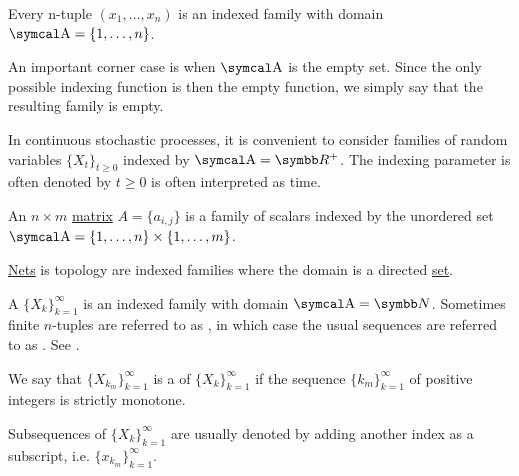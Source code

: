 \begin{example}\label{ex:indexed_families}
  \mbox{}
  \begin{defenum}
    \item Every n-tuple \( (x_1, \ldots, x_n) \) is an indexed family with domain \( \CA = \{ 1, \ldots, n \} \).

    \item An important corner case is when \( \CA \) is the empty set. Since the only possible indexing function is then the empty function, we simply say that the resulting family is empty.

    \item In continuous stochastic processes, it is convenient to consider families of random variables \( \{ X_t \}_{t \geq 0} \) indexed by \( \CA = \BR^+ \). The indexing parameter is often denoted by \( t \geq 0 \) is often interpreted as time.

    \item An \( n \times m \) \hyperref[def:array/matrix]{matrix} \( A = \{ a_{i,j} \} \) is a family of scalars indexed by the unordered set \( \CA = \{ 1, \ldots, n \} \times \{ 1, \ldots, m \} \).

    \item \hyperref[def:topological_net]{Nets} is topology are indexed families where the domain is a directed \hyperref[def:directed_set]{set}.
  \end{defenum}
\end{example}

\begin{definition}\label{def:sequence}
  A  \( \{ X_k \}_{k=1}^\infty \) is an indexed family with domain \( \CA = \BN \). Sometimes finite \( n \)-tuples are referred to as , in which case the usual sequences are referred to as . See .

  We say that \( \{ X_{k_m} \}_{k=1}^\infty \) is a  of \( \{ X_k \}_{k=1}^\infty \) if the sequence \( \{ k_m \}_{k=1}^\infty \) of positive integers is strictly monotone.

  Subsequences of \( \{ X_k \}_{k=1}^\infty \) are usually denoted by adding another index as a subscript, i.e. \( \{ x_{k_m} \}_{k=1}^\infty \).
\end{definition}

